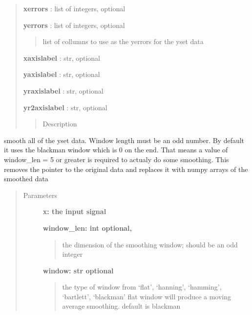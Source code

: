 \documentclass[letterpaper,10pt,english]{sphinxmanual}
\begin{document}
\begin{fulllineitems}
\begin{fulllineitems}
\begin{quote}
\begin{description}
\textbf{xerrors} : list of integers, optional

\textbf{yerrors} : list of integers, optional
\begin{quote}

list of collumns to use as the yerrors for the yset data
\end{quote}

\textbf{xaxislabel} : str, optional

\textbf{yaxislabel} : str, optional

\textbf{yraxislabel} : str, optional

\textbf{yr2axislabel} : str, optional
\begin{quote}

Description
\end{quote}

\end{description}\end{quote}

\end{fulllineitems}


\begin{fulllineitems}
\label{pubplots:pubplots.plotdata.PlotData.smooth}
smooth all of the yset data. Window length must be an odd number. By default it uses
the blackman window which is 0 on the end. That means a value of window\_len = 5 or greater
is required to actualy do some smoothing. This removes the pointer to the original data
and replaces it with numpy arrays of the smoothed data
\begin{quote}\begin{description}
\item[{Parameters}] \leavevmode
\textbf{x: the input signal}

\textbf{window\_len: int optional,}
\begin{quote}

the dimension of the smoothing window; should be an odd integer
\end{quote}

\textbf{window: str optional}
\begin{quote}

the type of window from `flat', `hanning', `hamming', `bartlett', `blackman'
flat window will produce a moving average smoothing. default is blackman
\end{quote}


\end{description}
\end{quote}
\end{fulllineitems}
\end{fulllineitems}
\end{document}
